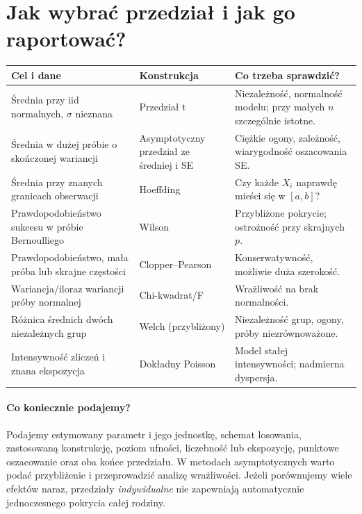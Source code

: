 \documentclass[11pt,a4paper,oneside]{report}
\numberwithin{equation}{chapter}
\theoremstyle{plain}
\theoremstyle{definition}
\theoremstyle{remark}
\begin{document}
\section{Jak wybrać przedział i jak go raportować?}
\begin{center}\small
\begin{tabular}{>{\raggedright\arraybackslash}p{}>{\raggedright\arraybackslash}p{}>{\raggedright\arraybackslash}p{}}
\toprule
\textbf{Cel i dane} & \textbf{Konstrukcja} & \textbf{Co trzeba sprawdzić?}\\
\midrule
Średnia przy iid normalnych, $\sigma$ nieznana & Przedział t & Niezależność, normalność modelu; przy małych $n$ szczególnie istotne.\\
Średnia w dużej próbie o skończonej wariancji & Asymptotyczny przedział ze średniej i SE & Ciężkie ogony, zależność, wiarygodność oszacowania SE.\\
Średnia przy znanych granicach obserwacji & Hoeffding & Czy każde $X_i$ naprawdę mieści się w $[a,b]$?\\
Prawdopodobieństwo sukcesu w próbie Bernoulliego & Wilson & Przybliżone pokrycie; ostrożność przy skrajnych $p$.\\
Prawdopodobieństwo, mała próba lub skrajne częstości & Clopper--Pearson & Konserwatywność, możliwie duża szerokość.\\
Wariancja/iloraz wariancji próby normalnej & Chi-kwadrat/F & Wrażliwość na brak normalności.\\
Różnica średnich dwóch niezależnych grup & Welch (przybliżony) & Niezależność grup, ogony, próby niezrównoważone.\\
Intensywność zliczeń i znana ekspozycja & Dokładny Poisson & Model stałej intensywności; nadmierna dyspersja.\\
\bottomrule
\end{tabular}
\end{center}

\paragraph{Co koniecznie podajemy?}
Podajemy estymowany parametr i jego jednostkę, schemat
losowania, zastosowaną konstrukcję, poziom ufności,
liczebność lub ekspozycję, punktowe oszacowanie oraz
oba końce przedziału. W metodach asymptotycznych warto
podać przybliżenie i przeprowadzić analizę wrażliwości.
Jeżeli porównujemy wiele efektów naraz, przedziały
\emph{indywidualne} nie zapewniają automatycznie
jednoczesnego pokrycia całej rodziny.
\end{document}
